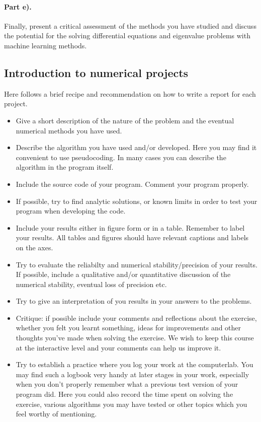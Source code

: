 \documentclass[%
oneside,                 %
final,                   %
10pt]{article}
\begin{document}
\paragraph{Part e).}
Finally, present a critical assessment of the methods you have studied and discuss the potential for the solving differential equations and eigenvalue problems with machine learning methods. 

\subsection{Introduction to numerical projects}

Here follows a brief recipe and recommendation on how to write a report for each
project.

\begin{itemize}
  \item Give a short description of the nature of the problem and the eventual  numerical methods you have used.

  \item Describe the algorithm you have used and/or developed. Here you may find it convenient to use pseudocoding. In many cases you can describe the algorithm in the program itself.

  \item Include the source code of your program. Comment your program properly.

  \item If possible, try to find analytic solutions, or known limits in order to test your program when developing the code.

  \item Include your results either in figure form or in a table. Remember to        label your results. All tables and figures should have relevant captions        and labels on the axes.

  \item Try to evaluate the reliabilty and numerical stability/precision of your results. If possible, include a qualitative and/or quantitative discussion of the numerical stability, eventual loss of precision etc.

  \item Try to give an interpretation of you results in your answers to  the problems.

  \item Critique: if possible include your comments and reflections about the  exercise, whether you felt you learnt something, ideas for improvements and  other thoughts you've made when solving the exercise. We wish to keep this course at the interactive level and your comments can help us improve it.

  \item Try to establish a practice where you log your work at the  computerlab. You may find such a logbook very handy at later stages in your work, especially when you don't properly remember  what a previous test version  of your program did. Here you could also record  the time spent on solving the exercise, various algorithms you may have tested or other topics which you feel worthy of mentioning.
\end{itemize}
\end{document}
